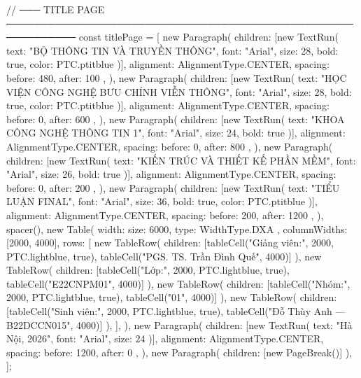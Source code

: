 {{{// ─── TITLE PAGE ────────────────────────────────────────────────────────────
const titlePage = [
  new Paragraph({
    children: [new TextRun({ text: "BỘ THÔNG TIN VÀ TRUYỀN THÔNG", font: "Arial", size: 28, bold: true, color: PTC.ptitblue })],
    alignment: AlignmentType.CENTER, spacing: { before: 480, after: 100 },
  }),
  new Paragraph({
    children: [new TextRun({ text: "HỌC VIỆN CÔNG NGHỆ BƯU CHÍNH VIỄN THÔNG", font: "Arial", size: 28, bold: true, color: PTC.ptitblue })],
    alignment: AlignmentType.CENTER, spacing: { before: 0, after: 600 },
  }),
  new Paragraph({
    children: [new TextRun({ text: "KHOA CÔNG NGHỆ THÔNG TIN 1", font: "Arial", size: 24, bold: true })],
    alignment: AlignmentType.CENTER, spacing: { before: 0, after: 800 },
  }),
  new Paragraph({
    children: [new TextRun({ text: "KIẾN TRÚC VÀ THIẾT KẾ PHẦN MỀM", font: "Arial", size: 26, bold: true })],
    alignment: AlignmentType.CENTER, spacing: { before: 0, after: 200 },
  }),
  new Paragraph({
    children: [new TextRun({ text: "TIỂU LUẬN FINAL", font: "Arial", size: 36, bold: true, color: PTC.ptitblue })],
    alignment: AlignmentType.CENTER, spacing: { before: 200, after: 1200 },
  }),
  spacer(),
  new Table({
    width: { size: 6000, type: WidthType.DXA },
    columnWidths: [2000, 4000],
    rows: [
      new TableRow({ children: [tableCell("Giảng viên:", 2000, PTC.lightblue, true), tableCell("PGS. TS. Trần Đình Quế", 4000)] }),
      new TableRow({ children: [tableCell("Lớp:", 2000, PTC.lightblue, true), tableCell("E22CNPM01", 4000)] }),
      new TableRow({ children: [tableCell("Nhóm:", 2000, PTC.lightblue, true), tableCell("01", 4000)] }),
      new TableRow({ children: [tableCell("Sinh viên:", 2000, PTC.lightblue, true), tableCell("Đỗ Thùy Anh — B22DCCN015", 4000)] }),
    ],
  }),
  new Paragraph({
    children: [new TextRun({ text: "Hà Nội, 2026", font: "Arial", size: 24 })],
    alignment: AlignmentType.CENTER, spacing: { before: 1200, after: 0 },
  }),
  new Paragraph({ children: [new PageBreak()] }),
];

}}}
